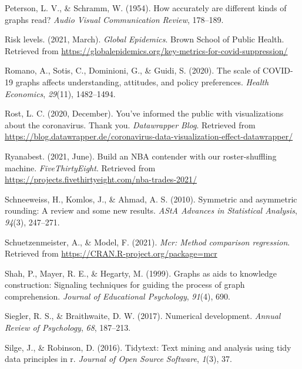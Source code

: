 \documentclass[print]{nuthesis}
\newlength{\cslhangindent}
\newenvironment{CSLReferences}[2]%
{\setlength{\parindent}{0pt}%
\everypar{\setlength{\hangindent}{\cslhangindent}}\ignorespaces}%
{\par}
\begin{document}
\begin{CSLReferences}{1}{0}
\leavevmode{}%
Peterson, L. V., \& Schramm, W. (1954). How accurately are different kinds of graphs read? \emph{Audio Visual Communication Review}, 178--189.

\leavevmode{}%
Risk levels. (2021, March). \emph{Global Epidemics}. Brown School of Public Health. Retrieved from \url{https://globalepidemics.org/key-metrics-for-covid-suppression/}

\leavevmode{}%
Romano, A., Sotis, C., Dominioni, G., \& Guidi, S. (2020). The scale of COVID-19 graphs affects understanding, attitudes, and policy preferences. \emph{Health Economics}, \emph{29}(11), 1482--1494.

\leavevmode{}%
Rost, L. C. (2020, December). You've informed the public with visualizations about the coronavirus. Thank you. \emph{Datawrapper Blog}. Retrieved from \url{https://blog.datawrapper.de/coronavirus-data-visualization-effect-datawrapper/}

\leavevmode{}%
Ryanabest. (2021, June). Build an NBA contender with our roster-shuffling machine. \emph{FiveThirtyEight}. Retrieved from \url{https://projects.fivethirtyeight.com/nba-trades-2021/}

\leavevmode{}%
Schneeweiss, H., Komlos, J., \& Ahmad, A. S. (2010). Symmetric and asymmetric rounding: A review and some new results. \emph{AStA Advances in Statistical Analysis}, \emph{94}(3), 247--271.

\leavevmode{}%
Schuetzenmeister, A., \& Model, F. (2021). \emph{Mcr: Method comparison regression}. Retrieved from \url{https://CRAN.R-project.org/package=mcr}

\leavevmode{}%
Shah, P., Mayer, R. E., \& Hegarty, M. (1999). Graphs as aids to knowledge construction: Signaling techniques for guiding the process of graph comprehension. \emph{Journal of Educational Psychology}, \emph{91}(4), 690.

\leavevmode{}%
Siegler, R. S., \& Braithwaite, D. W. (2017). Numerical development. \emph{Annual Review of Psychology}, \emph{68}, 187--213.

\leavevmode{}%
Silge, J., \& Robinson, D. (2016). Tidytext: Text mining and analysis using tidy data principles in r. \emph{Journal of Open Source Software}, \emph{1}(3), 37.


\end{CSLReferences}
\end{document}
